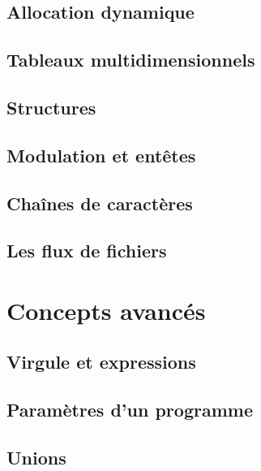 \documentclass{minitelreport}
\begin{document}
\begin{refsection}
		\section{Allocation dynamique}
			\label{sec:allocation_dynamique}
			
		\section{Tableaux multidimensionnels}
			\label{sec:tableaux_multidimensionnels}
			
		\section{Structures}
			\label{sec:structures}
			
		\section{Modulation et entêtes}
			\label{sec:modulation_et_entetes}
			
		\section{Chaînes de caractères}
			\label{sec:chaines_caracteres}
			
		\section{Les flux de fichiers}
			\label{sec:flux_fichiers}
			
	\chapter{Concepts avancés}
	\label{chap:concepts_avances}
		\section{Virgule et expressions}
			\label{sec:virgule_et_expressions}
			
		\section{Paramètres d'un programme}
			\label{sec:parametres_programme}
			
		\section{Unions}
			\label{sec:unions}
			

\end{refsection}
\end{document}
